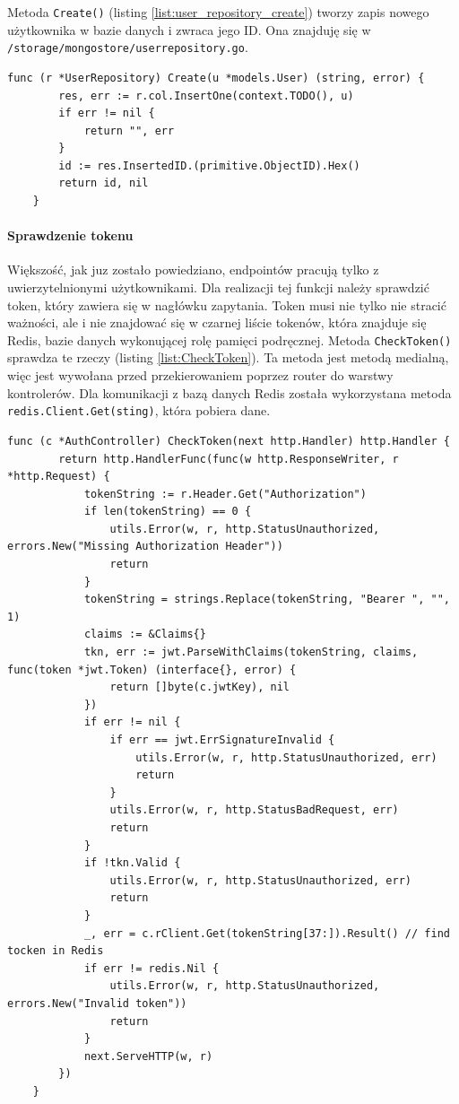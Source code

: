 Metoda \texttt{Create()} (listing \ref{list:user_repository_create}) tworzy zapis nowego użytkownika w bazie danych i zwraca jego ID.
Ona znajduję się w \texttt{/storage/mongostore/userrepository.go}.
\begin{lstlisting}[label=list:user_repository_create,caption=Zachowanie użytkownika do bazy danych,basicstyle=\tiny\ttfamily]
    func (r *UserRepository) Create(u *models.User) (string, error) {
        res, err := r.col.InsertOne(context.TODO(), u)
        if err != nil {
            return "", err
        }
        id := res.InsertedID.(primitive.ObjectID).Hex()
        return id, nil
    }
\end{lstlisting}

\paragraph{Sprawdzenie tokenu\newline}
Większość, jak juz zostało powiedziano, endpointów pracują tylko z uwierzytelnionymi użytkownikami. Dla realizacji tej funkcji należy sprawdzić token, który zawiera się w nagłówku zapytania.
Token musi nie tylko nie stracić ważności, ale i nie znajdować się w czarnej liście tokenów, która znajduje się Redis, bazie danych wykonującej rolę pamięci podręcznej.
Metoda \texttt{CheckToken()} sprawdza te rzeczy (listing \ref{list:CheckToken}). Ta metoda jest metodą medialną, więc jest wywołana przed przekierowaniem poprzez router do warstwy kontrolerów. Dla komunikacji z bazą danych Redis została wykorzystana metoda \texttt{redis.Client.Get(sting)}, która pobiera dane.
\begin{lstlisting}[label=list:CheckToken,caption=Walidacja JWT tokena,basicstyle=\tiny\ttfamily]
    func (c *AuthController) CheckToken(next http.Handler) http.Handler {
        return http.HandlerFunc(func(w http.ResponseWriter, r *http.Request) {
            tokenString := r.Header.Get("Authorization")
            if len(tokenString) == 0 {
                utils.Error(w, r, http.StatusUnauthorized, errors.New("Missing Authorization Header"))
                return
            }
            tokenString = strings.Replace(tokenString, "Bearer ", "", 1)
            claims := &Claims{}
            tkn, err := jwt.ParseWithClaims(tokenString, claims, func(token *jwt.Token) (interface{}, error) {
                return []byte(c.jwtKey), nil
            })
            if err != nil {
                if err == jwt.ErrSignatureInvalid {
                    utils.Error(w, r, http.StatusUnauthorized, err)
                    return
                }
                utils.Error(w, r, http.StatusBadRequest, err)
                return
            }
            if !tkn.Valid {
                utils.Error(w, r, http.StatusUnauthorized, err)
                return
            }
            _, err = c.rClient.Get(tokenString[37:]).Result() // find tocken in Redis
            if err != redis.Nil {
                utils.Error(w, r, http.StatusUnauthorized, errors.New("Invalid token"))
                return
            }
            next.ServeHTTP(w, r)
        })
    }
\end{lstlisting}

